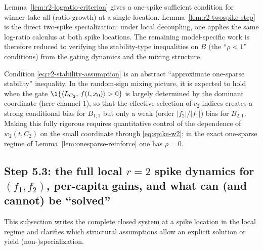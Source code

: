 \begin{remark}
Lemma~\ref{lem:r2-logratio-criterion} gives a one-spike sufficient condition for winner-take-all (ratio growth) at a single location.
Lemma~\ref{lem:r2-twospike-step} is the direct two-spike specialization: under local decoupling, one applies the same log-ratio calculus at both spike locations.
The remaining model-specific work is therefore reduced to verifying the stability-type inequalities on $B$ (the ``$\rho<1$'' conditions) from the gating dynamics and the mixing structure.
\end{remark}

\begin{remark}
Condition \eqref{eq:r2-stability-assumption} is an abstract ``approximate one-sparse stability'' inequality.
In the random-sign mixing picture, it is expected to hold when the gate $\1\{\ip{L_{C_2}}{f(t,x_0)}>0\}$ is largely determined by the dominant coordinate (here channel 1), so that the effective selection of $c_2$-indices creates a strong conditional bias for $B_{1,1}$ but only a weak (order $|f_2|/|f_1|$) bias for $B_{2,1}$.
Making this fully rigorous requires quantitative control of the dependence of $w_2(t,C_2)$ on the small coordinate through \eqref{eq:spike-w2}; in the exact one-sparse regime of Lemma~\ref{lem:onesparse-reinforce} one has $\rho=0$.
\end{remark}

\subsection{Step 5.3: the full local $r=2$ spike dynamics for $(f_1,f_2)$, per-capita gains, and what can (and cannot) be ``solved''}
\label{subsec:step53}

This subsection writes the complete closed system at a spike location in the local regime and clarifies which structural assumptions allow an explicit solution or yield (non-)specialization.

